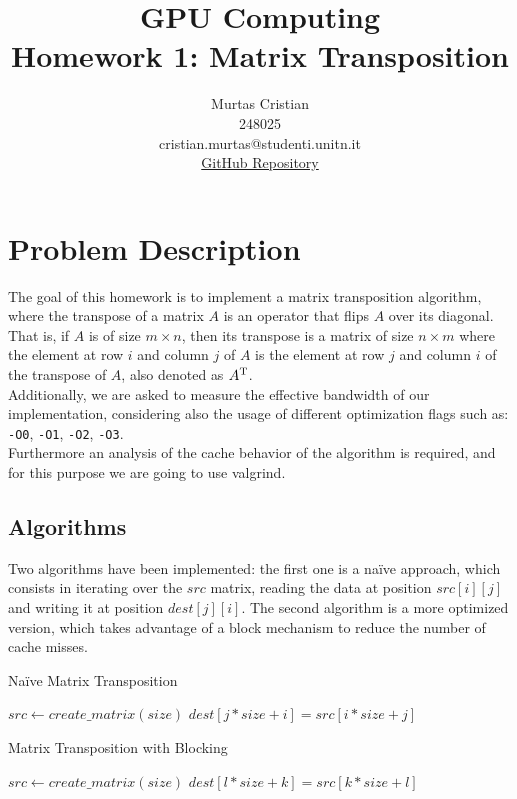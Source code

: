 \documentclass{article}
\title{\textbf{GPU Computing} \\
    \large Homework 1: Matrix Transposition \\
}
\author{Murtas Cristian \\ 248025 \\ cristian.murtas@studenti.unitn.it \\
\href{https://github.com/SecondarySkyler/gpu-computing/tree/main/matrix_transposition}{GitHub Repository}
}
\begin{document}
\maketitle

\section{Problem Description}
The goal of this homework is to implement a matrix transposition algorithm, where the transpose of a matrix $A$
is an operator that flips $A$ over its diagonal. That is, if $A$ is of size $m \times n$, then
its transpose is a matrix of size $n \times m$ where the element at row $i$ and column $j$ of $A$ is the element at 
row $j$ and column $i$ of the transpose of $A$, also denoted as $A\textsuperscript{T}$. \\
Additionally, we are asked to measure the effective bandwidth of our implementation, considering also the
usage of different optimization flags such as: \texttt{-O0}, \texttt{-O1}, \texttt{-O2}, \texttt{-O3}. \\
Furthermore an analysis of the cache behavior of the algorithm is required, and for this purpose we are going to use
valgrind.
\subsection{Algorithms}
Two algorithms have been implemented: the first one is a na\"{i}ve approach, which
consists in iterating over the $src$ matrix, reading the data at position $src[i][j]$ and writing it at position $dest [j][i]$. The second algorithm is a more optimized version, which takes advantage of a block mechanism to reduce the number of cache misses.
\begin{algorithm}
    \caption{Na\"{i}ve Matrix Transposition}
    \begin{algorithmic}[1]
        \State $src \gets create\_matrix(size)$
                \State $dest[j * size + i] = src[i * size + j]$
            \EndFor
        \EndFor
    \end{algorithmic}
\end{algorithm}
\begin{algorithm}
    \caption{Matrix Transposition with Blocking}
    \begin{algorithmic}[1]
        \State $src \gets create\_matrix(size)$
                 
                        \State $dest[l * size + k] = src[k * size + l]$
                    \EndFor
                \EndFor
            \EndFor
        \EndFor
    \end{algorithmic}
\end{algorithm}
\end{document}
